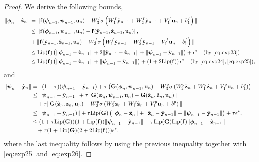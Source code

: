 \documentclass{article} \usepackage{iclr2022_conference,times}
\newcommand{\by}{{\bf y}}
\newcommand{\bz}{{\bf z}}
\newcommand{\bu}{{\bf u}}
\newcommand{\bc}{{\boldsymbol{\psi}}}
\newcommand{\bh}{{\boldsymbol{\phi}}}
\newcommand{\bG}{{\bf G}}
\newcommand{\bif}{{\bf f}}
\begin{document}
\begin{proof}
We derive the following bounds,
\begin{align*}
    \|\bh_n - \hat{\bz}_n\| &= \|\bif(\bh_{n-1},\bc_{n-1},\bu_n) - W^f_3\sigma\left(W^f_1 \tilde{\by}_{n-1} + W^f_2 \hat{\by}_{n-1} + V^f_1 \bu_n + b^f_1 \right)\| \\
    &\leq \|\bif(\bh_{n-1},\bc_{n-1},\bu_n)-\bif(\tilde{\by}_{n-1},\hat{\bz}_{n-1},\bu_n)\|, \\
    &+ \|\bif(\tilde{\by}_{n-1},\hat{\bz}_{n-1},\bu_n)- W^f_3\sigma\left(W^f_1 \tilde{\by}_{n-1} + W^f_2 \hat{\by}_{n-1} + V^f_1 \bu_n + b^f_1 \right)\|\\
    &\leq {\rm Lip}(\bif)\left(\|\bh_{n-1}-\hat{\bz}_{n-1}\|+2\|\tilde{\by}_{n-1}-\hat{\bz}_{n-1}\|+\|\bc_{n-1}-\tilde{\by}_{n-1}\|\right) + \epsilon^{\ast}\quad ({\rm by}~\eqref{eq:exp23}) \\
    &\leq {\rm Lip}(\bif)\left(\|\bh_{n-1}-\hat{\bz}_{n-1}\|+\|\bc_{n-1}-\tilde{\by}_{n-1}\|\right) +\left(1 + 2{\rm Lip}(\bif)\right)\epsilon^{\ast} \quad ({\rm by}~\eqref{eq:exp24},\eqref{eq:exp25}),
\end{align*}
and
\begin{align*}
    \|\bc_n - \hat{\by}_n\| &=  \|(1-\tau)(\bc_{n-1}-\hat{\by}_{n-1}) + \tau \left(\bG(\bh_{n},\bc_{n-1},\bu_n) - W^g_3\sigma\left(W^g_2 \tilde{\bz}_{n} + W^g_1 \hat{\bz}_{n} + V^g_1 \bu_n + b^g_1 \right)\right)\| \\
    &\leq \|\bc_{n-1}-\hat{\by}_{n-1}\| + \tau\|\bG(\bh_{n},\bc_{n-1},\bu_n)-\bG(\hat{\bz}_{n},\tilde{\bz}_n,\bu_n)\| 
    \\&\hspace{0.325cm}+\tau \|\bG(\hat{\bz}_{n},\tilde{\bz}_{n},\bu_n)-W^g_3\sigma\left(W^g_2 \tilde{\bz}_{n} + W^g_1 \hat{\bz}_{n} + V^g_1 \bu_n + b^g_1 \right)\|\\
    &\leq \|\bc_{n-1}-\hat{\by}_{n-1})\| + \tau{\rm Lip}(\bG)\left(\|\bh_n - \hat{\bz}_n\| + \|\tilde{\bz}_n - \hat{\by}_{n-1}\| + \|\bc_{n-1} - \hat{\by}_{n-1}\|\right) + \tau\epsilon^{\ast}, \\ 
    &\leq (1 + \tau{\rm Lip}(\bG))(1+{\rm Lip}(\bif))\|\bc_{n-1} - \hat{\by}_{n-1}\| + \tau{\rm Lip}(\bG){\rm Lip}(\bif)\|\bh_{n-1}-\hat{\bz}_{n-1}\|\\&\hspace{0.325cm}+ \tau(1 +{\rm Lip}(\bG)(2+2{\rm Lip}(\bif)))\epsilon^{\ast},
    \end{align*}
where the last inequality follows by using the previous inequality together with \eqref{eq:exp25} and \eqref{eq:exp26}. 


\end{proof}
\end{document}
